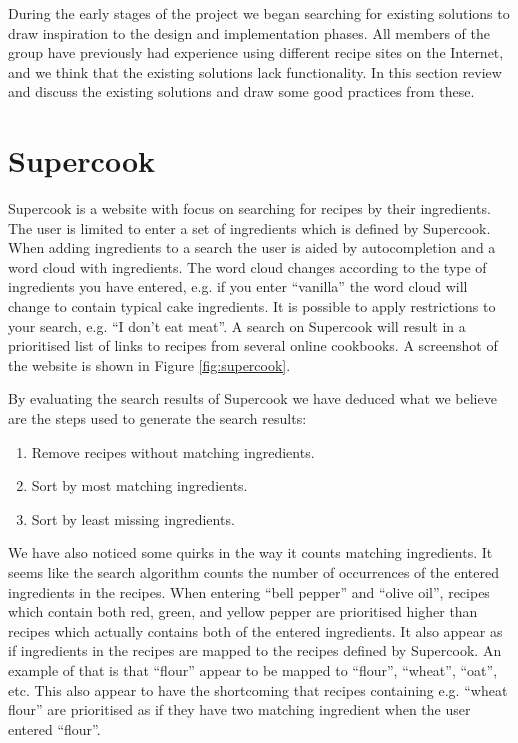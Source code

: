 During the early stages of the project we began searching for existing solutions to draw inspiration to the design and implementation phases. All members of the group have previously had experience using different recipe sites on the Internet, and we  think that the existing solutions lack functionality. In this section review and discuss the existing solutions and draw some good practices from these.

\section{Supercook}
Supercook\cite{supercook} is a website with focus on searching for recipes by their ingredients. The user is limited to enter a set of ingredients which is defined by Supercook. When adding ingredients to a search the user is aided by autocompletion and a word cloud with ingredients. The word cloud changes according to the type of ingredients you have entered, e.g. if you enter ``vanilla'' the word cloud will change to contain typical cake ingredients. It is possible to apply restrictions to your search, e.g. ``I don't eat meat''. A search on Supercook will result in a prioritised list of links to recipes from several online cookbooks. A screenshot of the website is shown in Figure \ref{fig:supercook}.

By evaluating the search results of Supercook we have deduced what we believe are the steps used to generate the search results:
\begin{enumerate}
	\item Remove recipes without matching ingredients.
	\item Sort by most matching ingredients.
	\item Sort by least missing ingredients.
\end{enumerate}
We have also noticed some quirks in the way it counts matching ingredients. It seems like the search algorithm counts the number of occurrences of the entered ingredients in the recipes. When entering ``bell pepper'' and ``olive oil'', recipes which contain both red, green, and yellow pepper are prioritised higher than recipes which actually contains both of the entered ingredients. It also appear as if ingredients in the recipes are mapped to the recipes defined by Supercook. An example of that is that ``flour'' appear to be mapped to ``flour'', ``wheat'', ``oat'', etc. This also appear to have the shortcoming that recipes containing e.g. ``wheat flour'' are prioritised as if they have two matching ingredient when the user entered ``flour''.

